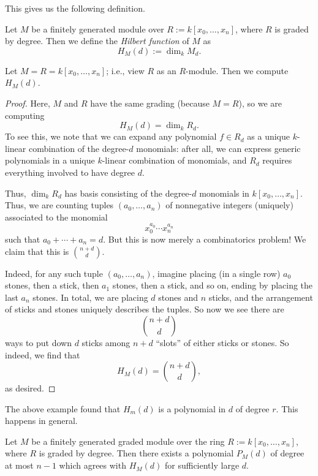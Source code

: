 \documentclass[../notes.tex]{subfiles}
\begin{document}
This gives us the following definition.
\begin{definition}
	Let $M$ be a finitely generated module over $R:=k[x_0,\ldots,x_n]$, where $R$ is graded by degree. Then we define the \textit{Hilbert function} of $M$ as
	\[H_M(d):=\dim_kM_d.\]
\end{definition}
\begin{exe} \label{exe:hilbfuncex}
	Let $M=R=k[x_0,\ldots,x_n]$; i.e., view $R$ as an $R$-module. Then we compute $H_M(d)$.
\end{exe}
\begin{proof}
	Here, $M$ and $R$ have the same grading (because $M=R$), so we are computing
	\[H_M(d)=\dim_kR_d.\]
	To see this, we note that we can expand any polynomial $f\in R_d$ as a unique $k$-linear combination of the degree-$d$ monomials: after all, we can express generic polynomials in a unique $k$-linear combination of monomials, and $R_d$ requires everything involved to have degree $d$.

	Thus, $\dim_kR_d$ has basis consisting of the degree-$d$ monomials in $k[x_0,\ldots,x_n]$. Thus, we are counting tuples $(a_0,\ldots,a_n)$ of nonnegative integers (uniquely) associated to the monomial
	\[x_0^{a_0}\cdots x_n^{a_n}\]
	such that $a_0+\cdots+a_n=d$. But this is now merely a combinatorics problem! We claim that this is $\binom{n+d}d$.
	
	Indeed, for any such tuple $(a_0,\ldots,a_n)$, imagine placing (in a single row) $a_0$ stones, then a stick, then $a_1$ stones, then a stick, and so on, ending by placing the last $a_n$ stones. In total, we are placing $d$ stones and $n$ sticks, and the arrangement of sticks and stones uniquely describes the tuples. So now we see there are
	\[\binom{n+d}d\]
	ways to put down $d$ sticks among $n+d$ ``slots'' of either sticks or stones. So indeed, we find that
	\[\boxed{H_M(d)=\binom{n+d}d},\]
	as desired.
\end{proof}
The above example found that $H_m(d)$ is a polynomial in $d$ of degree $r$. This happens in general.
\begin{theorem} \label{thm:hilbertpoly}
	Let $M$ be a finitely generated graded module over the ring $R:=k[x_0,\ldots,x_n]$, where $R$ is graded by degree. Then there exists a polynomial $P_M(d)$ of degree at most $n-1$ which agrees with $H_M(d)$ for sufficiently large $d$.
\end{theorem}
\end{document}
